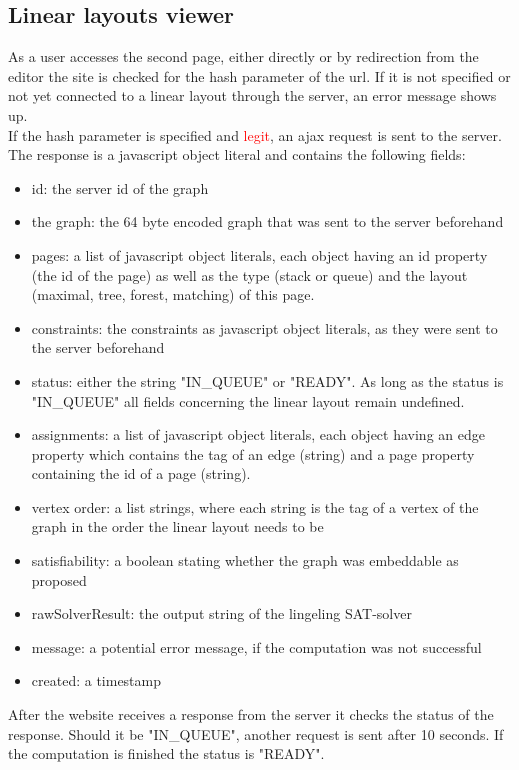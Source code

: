 \subsection{Linear layouts viewer}
As a user accesses the second page, either directly or by redirection from the editor the site is checked for the hash parameter of the url. If it is not specified or not yet connected to a linear layout through the server, an error message shows up.\\
If the hash parameter is specified and \textcolor{red}{legit}, an ajax request is sent to the server.
The response is a javascript object literal and contains the following fields:
\begin{itemize}
\item id: the server id of the graph 
\item the graph: the 64 byte encoded graph that was sent to the server beforehand
\item pages: a list of javascript object literals, each object having an id property (the id of the page) as well as the type (stack or queue) and the layout (maximal, tree, forest, matching) of this page.
\item constraints: the constraints as javascript object literals, as they were sent to the server beforehand
\item status: either the string "IN\_QUEUE" or "READY". As long as the status is "IN\_QUEUE" all fields concerning the linear layout remain undefined.
\item assignments: a list of javascript object literals, each object having an edge property which contains the tag of an edge (string) and a page property containing the id of a page (string).
\item vertex order: a list strings, where each string is the tag of a vertex of the graph in the order the linear layout needs to be
\item satisfiability: a boolean stating whether the graph was embeddable as proposed
\item rawSolverResult: the output string of the lingeling SAT-solver
\item message: a potential error message, if the computation was not successful
\item created: a timestamp
\end{itemize}
After the website receives a response from the server it checks the status of the response. Should it be "IN\_QUEUE", another request is sent after 10 seconds. If the computation is finished the status is "READY".
